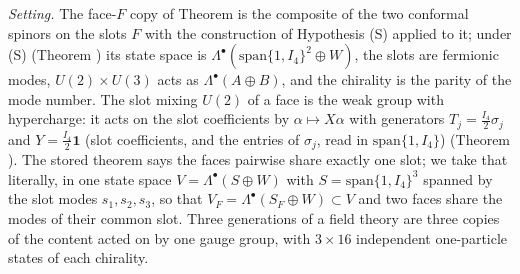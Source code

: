 \emph{Setting.} The face-$F$ copy of Theorem  is the composite of the two conformal spinors on the slots $F$ with the construction of Hypothesis (S) applied to it; under (S) (Theorem ) its state space is $\Lambda^{\bullet}(\mathrm{span}\{1, I_4\}^{2} \oplus W)$, the slots are fermionic modes, $U(2) \times U(3)$ acts as $\Lambda^{\bullet}(A \oplus B)$, and the chirality is the parity of the mode number. The slot mixing $U(2)$ of a face is the weak group with hypercharge: it acts on the slot coefficients by $\alpha \mapsto X\alpha$ with generators $T_{j} = \tfrac{I_4}{2}\sigma_{j}$ and $Y = \tfrac{I_4}{2}\mathbf{1}$ (slot coefficients, and the entries of $\sigma_{j}$, read in $\mathrm{span}\{1, I_4\}$) (Theorem ). The stored theorem says the faces pairwise share exactly one slot; we take that literally, in one state space $V = \Lambda^{\bullet}(S \oplus W)$ with $S = \mathrm{span}\{1, I_4\}^{3}$ spanned by the slot modes $s_{1}, s_{2}, s_{3}$, so that $V_{F} = \Lambda^{\bullet}(S_{F} \oplus W) \subset V$ and two faces share the modes of their common slot. Three generations of a field theory are three copies of the content acted on by one gauge group, with $3 \times 16$ independent one-particle states of each chirality.

